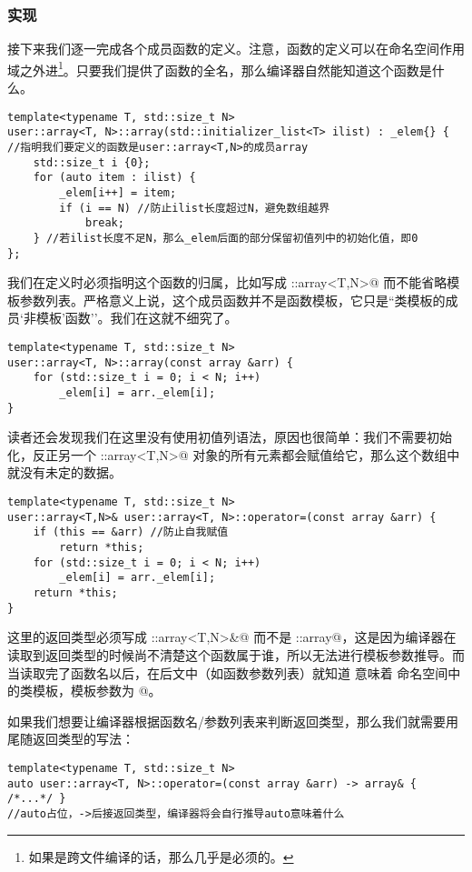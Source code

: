 \subsubsection*{实现}
接下来我们逐一完成各个成员函数的定义。注意，函数的定义可以在命名空间作用域之外进\footnote{如果是跨文件编译的话，那么几乎是必须的。}。只要我们提供了函数的全名，那么编译器自然能知道这个函数是什么。
\begin{lstlisting}
template<typename T, std::size_t N>
user::array<T, N>::array(std::initializer_list<T> ilist) : _elem{} {
//指明我们要定义的函数是user::array<T,N>的成员array
    std::size_t i {0};
    for (auto item : ilist) {
        _elem[i++] = item;
        if (i == N) //防止ilist长度超过N，避免数组越界
            break;
    } //若ilist长度不足N，那么_elem后面的部分保留初值列中的初始化值，即0
};
\end{lstlisting}
我们在定义时必须指明这个函数的归属，比如写成 \lstinline@user::array<T,N>@ 而不能省略模板参数列表。严格意义上说，这个成员函数并不是函数模板，它只是``类模板的成员`非模板'函数''。我们在这就不细究了。\par
\begin{lstlisting}
template<typename T, std::size_t N>
user::array<T, N>::array(const array &arr) {
    for (std::size_t i = 0; i < N; i++)
        _elem[i] = arr._elem[i];
}
\end{lstlisting}
读者还会发现我们在这里没有使用初值列语法，原因也很简单：我们不需要初始化，反正另一个 \lstinline@user::array<T,N>@ 对象的所有元素都会赋值给它，那么这个数组中就没有未定的数据。\par
\begin{lstlisting}
template<typename T, std::size_t N>
user::array<T,N>& user::array<T, N>::operator=(const array &arr) {
    if (this == &arr) //防止自我赋值
        return *this;
    for (std::size_t i = 0; i < N; i++)
        _elem[i] = arr._elem[i];
    return *this;
}
\end{lstlisting}
这里的返回类型必须写成 \lstinline@user::array<T,N>&@ 而不是 \lstinline@user::array@，这是因为编译器在读取到返回类型的时候尚不清楚这个函数属于谁，所以无法进行模板参数推导。而当读取完了函数名以后，在后文中（如函数参数列表）就知道 \lstinline@array@ 意味着 \lstinline@user@ 命名空间中的类模板，模板参数为 @。\par
如果我们想要让编译器根据函数名/参数列表来判断返回类型，那么我们就需要用尾随返回类型的写法：
\begin{lstlisting}
template<typename T, std::size_t N>
auto user::array<T, N>::operator=(const array &arr) -> array& { /*...*/ }
//auto占位，->后接返回类型，编译器将会自行推导auto意味着什么
\end{lstlisting}
